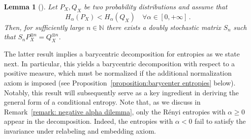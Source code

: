 \documentclass[aps,pra,11pt,onecolumn,nofootinbib,tightenlines]{revtex4-2}
\newtheorem{lemma}[theorem]{Lemma}
\theoremstyle{definition}
\begin{document}
\begin{lemma}[{\cite[Proposition 3.7]{Jensen_Kjaerulf_2019}}]\label{lemma:Jensen}
Let $P_X,Q_X$ be two probability distributions and assume that 
\begin{equation}
    H_\alpha(P_X) < H_\alpha(Q_X)  \quad \forall \alpha\in[0,+\infty] \,.
\end{equation}
Then, for sufficiently large $n \in \mathbb{N}$ there exists a doubly stochastic matrix $S_n$ such that
$S_nP_X^{\otimes n} = Q_X^{\otimes n}$.
\end{lemma}
The latter result implies a barycentric decomposition for entropies as we state next.
In particular, this yields a barycentric decomposition with respect to a positive measure, which must be normalized if the additional normalization axiom is imposed (see Proposition~\ref{proposition:barycenter entropies} below).
 Notably, this result will subsequently serve as a key ingredient in deriving the general form of a conditional entropy.  Note that, as we discuss in Remark~\ref{remark: negative alpha dilemma}, only the Rényi entropies with 
$\alpha \geq 0$ appear in the decomposition. Indeed, the entropies with $\alpha<0$ fail to satisfy the invariance under relabeling and embedding axiom.
\end{document}
